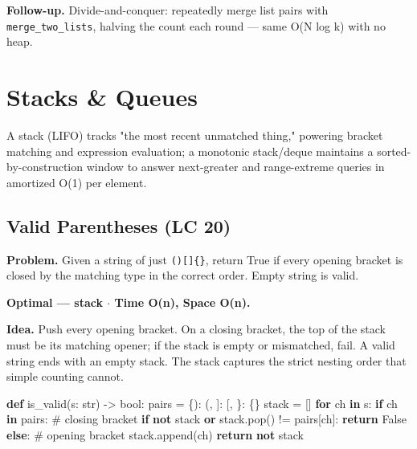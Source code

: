 \documentclass[11pt]{article}
\newenvironment{Shaded}{\begin{snugshade}}{\end{snugshade}}
\newcommand{\BuiltInTok}[1]{\textcolor[rgb]{0.50,0.55,0.55}{#1}}
\newcommand{\CommentTok}[1]{\textcolor[rgb]{0.48,0.49,0.49}{#1}}
\newcommand{\ControlFlowTok}[1]{\textcolor[rgb]{0.99,0.74,0.29}{\textbf{#1}}}
\newcommand{\KeywordTok}[1]{\textcolor[rgb]{0.81,0.81,0.76}{\textbf{#1}}}
\newcommand{\NormalTok}[1]{\textcolor[rgb]{0.81,0.81,0.76}{#1}}
\newcommand{\OperatorTok}[1]{\textcolor[rgb]{0.81,0.81,0.76}{#1}}
\newcommand{\StringTok}[1]{\textcolor[rgb]{0.96,0.31,0.31}{#1}}
\newcommand{\VariableTok}[1]{\textcolor[rgb]{0.15,0.68,0.68}{#1}}
\begin{document}
\textbf{Follow-up.} Divide-and-conquer: repeatedly merge list pairs with \texttt{merge\_two\_lists}, halving the count each round --- same O(N log k) with no heap.

\section{Stacks \& Queues}\label{stacks--queues}

A stack (LIFO) tracks "the most recent unmatched thing," powering bracket matching and expression evaluation; a monotonic stack/deque maintains a sorted-by-construction window to answer next-greater and range-extreme queries in amortized O(1) per element.

\subsection{Valid Parentheses (LC 20)}\label{valid-parentheses-lc-20}

\textbf{Problem.} Given a string of just \texttt{(){[}{]}\{\}}, return True if every opening bracket is closed by the matching type in the correct order. Empty string is valid.

\textbf{Optimal --- stack \(\cdot\) Time O(n), Space O(n).}

\textbf{Idea.} Push every opening bracket. On a closing bracket, the top of the stack must be its matching opener; if the stack is empty or mismatched, fail. A valid string ends with an empty stack. The stack captures the strict nesting order that simple counting cannot.


\begin{Shaded}
\begin{Highlighting}[]
\KeywordTok{def}\NormalTok{ is\_valid(s: }\BuiltInTok{str}\NormalTok{) }\OperatorTok{{-}\textgreater{}} \BuiltInTok{bool}\NormalTok{:}
\NormalTok{    pairs }\OperatorTok{=}\NormalTok{ \{}\StringTok{\textquotesingle{})\textquotesingle{}}\NormalTok{: }\StringTok{\textquotesingle{}(\textquotesingle{}}\NormalTok{, }\StringTok{\textquotesingle{}]\textquotesingle{}}\NormalTok{: }\StringTok{\textquotesingle{}[\textquotesingle{}}\NormalTok{, }\StringTok{\textquotesingle{}\}\textquotesingle{}}\NormalTok{: }\StringTok{\textquotesingle{}\{\textquotesingle{}}\NormalTok{\}}
\NormalTok{    stack }\OperatorTok{=}\NormalTok{ []}
    \ControlFlowTok{for}\NormalTok{ ch }\KeywordTok{in}\NormalTok{ s:}
        \ControlFlowTok{if}\NormalTok{ ch }\KeywordTok{in}\NormalTok{ pairs:                       }\CommentTok{\# closing bracket}
            \ControlFlowTok{if} \KeywordTok{not}\NormalTok{ stack }\KeywordTok{or}\NormalTok{ stack.pop() }\OperatorTok{!=}\NormalTok{ pairs[ch]:}
                \ControlFlowTok{return} \VariableTok{False}
        \ControlFlowTok{else}\NormalTok{:                                 }\CommentTok{\# opening bracket}
\NormalTok{            stack.append(ch)}
    \ControlFlowTok{return} \KeywordTok{not}\NormalTok{ stack}
\end{Highlighting}
\end{Shaded}
\end{document}
